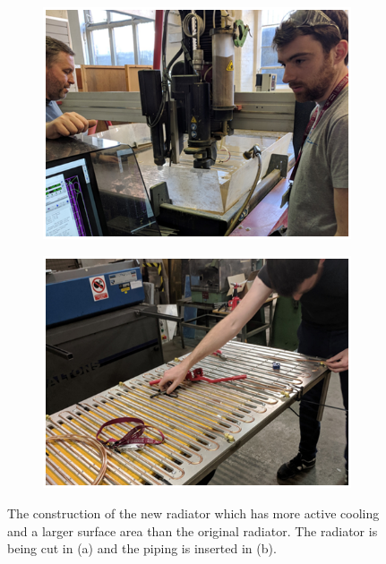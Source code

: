 \begin{figure}[!h]
\centering
\begin{subfigure}{.5\textwidth}
  \centering
  \includegraphics[width=\linewidth]{Chapter3/Figs/Raster/detCon011b_RadiatorConstruction.png}
  \captionsetup{width=.9\linewidth}
  \caption{}
  \label{subFig:detCon011b_RadiatorConstruction}
\end{subfigure}%
\begin{subfigure}{.5\textwidth}
  \centering
  \includegraphics[width=\linewidth]{Chapter3/Figs/Raster/detCon012b_RadiatorPiping.png}
  \captionsetup{width=.9\linewidth}
  \caption{}
  \label{subFig:detCon012b_RadiatorPiping}
\end{subfigure}
\caption[Construction of the new more massive radiator.]{The construction of the new radiator which has more active cooling and a larger surface area than the original radiator. The radiator is being cut in (a) and the piping is inserted in (b).}
\label{fig:detCon_RadiatorConstruction_RadiatorPiping}
\end{figure}

